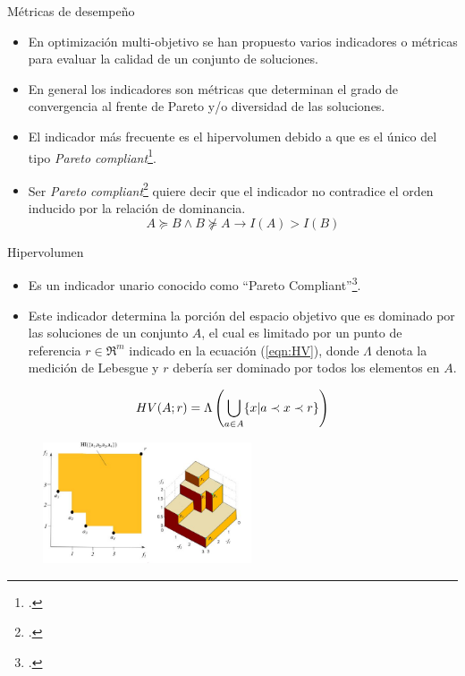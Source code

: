 \documentclass{beamer}
\begin{document}
\begin{frame}{Métricas de desempeño}
   \begin{itemize}
	\scriptsize
        \item En optimización multi-objetivo se han propuesto varios indicadores o métricas para evaluar la calidad de un conjunto de soluciones.
	\item En general los indicadores son métricas que determinan el grado de convergencia al frente de Pareto y/o diversidad de las soluciones.
	\item El indicador más frecuente es el hipervolumen debido a que es el único del tipo \textit{Pareto compliant}\footcite
{Joel:ComparativeCaseStudy}.
	\item Ser \textit{Pareto compliant}\footcite{Joel:ComparacionMetricas} quiere decir que el indicador no contradice el orden inducido por la relación de dominancia.
	\begin{equation*}
	   A \succeq B \wedge  B \not \succeq A \rightarrow I(A) > I(B)
	\end{equation*}
   \end{itemize} 
\end{frame}


\begin{frame}{Hipervolumen}
\begin{itemize}
\scriptsize
\justifying
\item Es un indicador unario conocido como ``Pareto Compliant''\footcite{zitzler1999evolutionary}.
\item Este indicador determina la porción del espacio objetivo que es dominado por las soluciones de un conjunto $A$, el cual es limitado por un punto de referencia $r \in \Re^m$ indicado en la ecuación (\ref{eqn:HV}), donde $\Lambda$ denota la medición de Lebesgue y $r$ debería ser dominado por todos los elementos en $A$.
\end{itemize}
\begin{equation}\label{eqn:HV}
\scriptsize
    HV(A;r) = \Lambda \left (  \bigcup_{a \in A} \{ x | a \prec x \prec r \} \right )
\end{equation}

\begin{figure}[H]
\centering
\includegraphics[width=0.55\textwidth]{Images/HV.jpg}
\end{figure}
\end{frame}
\end{document}

